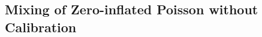 \documentclass[10pt]{article}
\begin{document}



\subsection{Mixing of Zero-inflated Poisson without Calibration}
\end{document}
